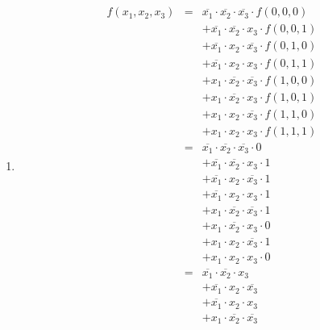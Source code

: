 \documentclass[DIN, pagenumber=false, fontsize=11pt, parskip=half]{scrartcl}
\begin{document}
    \subsection{}
    \begin{enumerate}[label=(\alph*)]
        \item
            \begin{eqnarray*}
                f(x_1, x_2, x_3) &=& \overline{x_1} \cdot \overline{x_2} \cdot \overline{x_3} \cdot f(0,0,0) \\
                &&+ \overline{x_1} \cdot \overline{x_2} \cdot x_3 \cdot f(0,0,1) \\
                &&+ \overline{x_1} \cdot x_2 \cdot \overline{x_3} \cdot f(0,1,0) \\
                &&+ \overline{x_1} \cdot x_2 \cdot x_3 \cdot f(0,1,1) \\
                &&+ x_1 \cdot \overline{x_2} \cdot \overline{x_3} \cdot f(1,0,0) \\
                &&+ x_1 \cdot \overline{x_2} \cdot x_3 \cdot f(1,0,1) \\
                &&+ x_1 \cdot x_2 \cdot \overline{x_3} \cdot f(1,1,0) \\
                &&+ x_1 \cdot x_2 \cdot x_3 \cdot f(1,1,1) \\
                &=& \overline{x_1} \cdot \overline{x_2} \cdot \overline{x_3} \cdot 0 \\
                &&+ \overline{x_1} \cdot \overline{x_2} \cdot x_3 \cdot 1 \\
                &&+ \overline{x_1} \cdot x_2 \cdot \overline{x_3} \cdot 1 \\
                &&+ \overline{x_1} \cdot x_2 \cdot x_3 \cdot 1 \\
                &&+ x_1 \cdot \overline{x_2} \cdot \overline{x_3} \cdot 1 \\
                &&+ x_1 \cdot \overline{x_2} \cdot x_3 \cdot 0 \\
                &&+ x_1 \cdot x_2 \cdot \overline{x_3} \cdot 1 \\
                &&+ x_1 \cdot x_2 \cdot x_3 \cdot 0 \\
                &=& \overline{x_1} \cdot \overline{x_2} \cdot x_3 \\
                &&+ \overline{x_1} \cdot x_2 \cdot \overline{x_3} \\
                &&+ \overline{x_1} \cdot x_2 \cdot x_3\\
                &&+ x_1 \cdot \overline{x_2} \cdot \overline{x_3} \\

\end{eqnarray*}
\end{enumerate}
\end{document}
